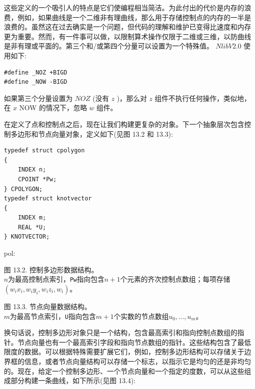 \documentclass[../main.tex]{subfiles}
\begin{document}
这些定义的一个吸引人的特点是它们使编程相当简洁。为此付出的代价是内存的浪费，例如，如果曲线是一个二维非有理曲线，那么用于存储控制点的内存的一半是浪费的。虽然这在过去确实是一个问题，但代码的理解和维护已变得比速度和内存更为重要。然而，有一件事可以做，以限制算术操作仅限于二维或三维，以防曲线是非有理或平面的。第三个和/或第四个分量可以设置为一个特殊值。 \(\mathit{{NlibV2.0}}\) 使用如下:

\begin{verbatim}
#define _NOZ +BIGD
#define _NOW -BIGD
\end{verbatim}

如果第三个分量设置为 \({NOZ}\) (没有 \(z\) )，那么对 \(z\) 组件不执行任何操作，类似地，在 \(x\) NOW 的情况下，忽略 \(w\) 组件。

在定义了点和控制点之后，现在让我们构建更复杂的对象。下一个抽象层次包含控制多边形和节点向量对象，定义如下(见图 13.2 和 13.3):

\begin{verbatim}
typedef struct cpolygon
{
    INDEX n;
    CPOINT *Pw;
} CPOLYGON;
typedef struct knotvector
{
    INDEX m;
    REAL *U;
} KNOTVECTOR;
\end{verbatim}

pol:

\begin{center}
\begin{minipage}{26cm}
\centering
{}
\par\smallskip
图 13.2. 控制多边形数据结构。\\
$n$为最高控制点索引，\texttt{Pw}指向包含$n+1$个元素的齐次控制点数组；每项存储$(w_ix_i,w_iy_i,w_iz_i,w_i)$。
\end{minipage}
\end{center}

\begin{center}
\begin{minipage}{26cm}
\centering
{}
\par\smallskip
图 13.3. 节点向量数据结构。\\
$m$为最高节点索引，\texttt{U}指向包含$m+1$个实数的节点数组$u_0,\ldots,u_m$。
\end{minipage}
\end{center}

换句话说，控制多边形对象只是一个结构，包含最高索引和指向控制点数组的指针。节点向量也有一个最高索引字段和指向节点数组的指针。这些结构包含了最低限度的数据。可以根据特殊需要扩展它们，例如，控制多边形结构可以存储关于边界框的信息，或者节点向量结构可以存储一个标志，以指示它是均匀的还是非均匀的。现在，给定一个控制多边形、一个节点向量和一个指定的度数，可以从这些组成部分构建一条曲线，如下所示(见图 13.4):
\end{document}
